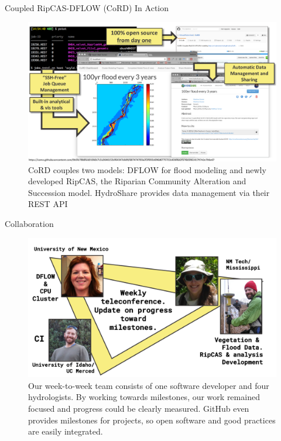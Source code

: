 \documentclass[final]{beamer}
\newlength{\twocolwid}
\begin{document}
\begin{frame}[t]
\begin{columns}[t]
\begin{column}{\twocolwid}
    \begin{alertblock}{Coupled RipCAS-DFLOW (CoRD) In Action}
        \begin{figure}
            \includegraphics[width=0.8\linewidth]{Figure1.pdf}
            \caption{CoRD couples two models: DFLOW for flood modeling and
            newly developed RipCAS, the Riparian Community Alteration and
            Succession model. HydroShare\cite{Horsburgh2016} provides data
            management via their REST API \cite{HydroShare2016}}
        \end{figure}
    \end{alertblock}

    \vspace{1in}

    \begin{alertblock}{Collaboration}
         
        \begin{figure}
            \includegraphics[width=0.6\linewidth]{Figure2.pdf}
            \caption{Our week-to-week team consists of one 
        software developer and 
        four hydrologists. By working towards
        milestones, our work remained focused and progress could be
        clearly measured. GitHub even provides milestones for projects,
        so open software and good practices are easily integrated.}
        \end{figure}
    \end{alertblock}

\end{column} %


\end{columns}
\end{frame}
\end{document}
